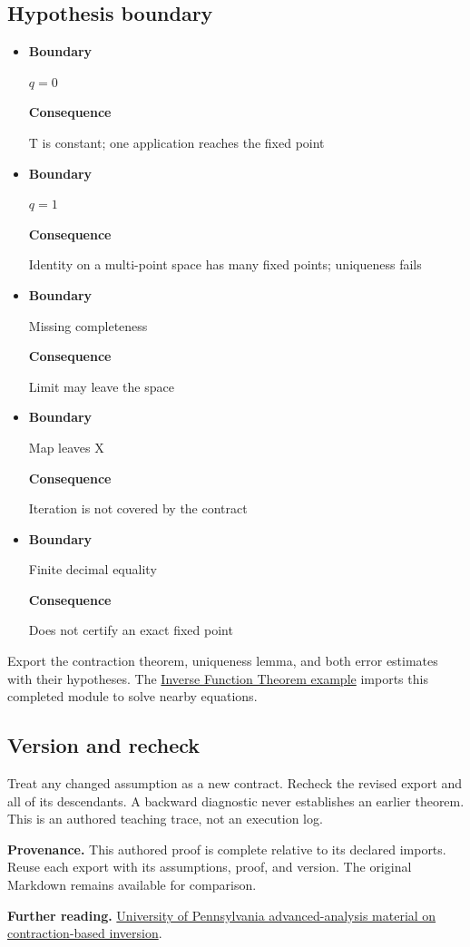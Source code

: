 \documentclass[preprint,12pt,aps,pra,showkeys,amsmath,amssymb,superscriptaddress,floatfix]{revtex4-2}
\theoremstyle{definition}
\theoremstyle{remark}
\begin{document}
\subsection{Hypothesis boundary}
\begin{itemize}
\item
  \textbf{Boundary}

  \(q=0\)

  \textbf{Consequence}

  T is constant; one application reaches the fixed point
\item
  \textbf{Boundary}

  \(q=1\)

  \textbf{Consequence}

  Identity on a multi-point space has many fixed points; uniqueness
  fails
\item
  \textbf{Boundary}

  Missing completeness

  \textbf{Consequence}

  Limit may leave the space
\item
  \textbf{Boundary}

  Map leaves X

  \textbf{Consequence}

  Iteration is not covered by the contract
\item
  \textbf{Boundary}

  Finite decimal equality

  \textbf{Consequence}

  Does not certify an exact fixed point
\end{itemize}

Export the contraction theorem, uniqueness lemma, and both error
estimates with their hypotheses. The
\href{../../../2-Analysis/Advanced-Calculus/projects/inverse-function-theorem.md}{Inverse
Function Theorem example} imports this completed module to solve nearby
equations.

\subsection{Version and recheck}
Treat any changed assumption as a new contract. Recheck the revised
export and all of its descendants. A backward diagnostic never
establishes an earlier theorem. This is an authored teaching trace, not
an execution log.

\par\medskip\begingroup\small\linespread{1.0}\selectfont\noindent\textbf{Provenance.} This authored proof is complete relative to its declared imports. Reuse
each export with its assumptions, proof, and version. The original
Markdown remains available for comparison.
\par\endgroup

\par\smallskip\begingroup\small\linespread{1.0}\selectfont\noindent\textbf{Further reading.} \href{https://www2.math.upenn.edu/~gressman/analysis/12-inversefuncthm.html}{University
of Pennsylvania advanced-analysis material on contraction-based
inversion}.\par\endgroup
\end{document}
